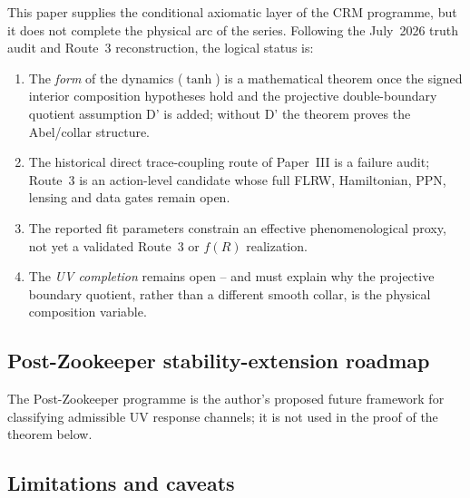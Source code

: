 \documentclass[aps,prd,twocolumn,superscriptaddress,nofootinbib]{revtex4-2}
\begin{document}
This paper supplies the conditional axiomatic layer of the CRM programme, but it does not complete the physical arc of the series. Following the July~2026 truth audit and Route~3 reconstruction, the logical status is:
\begin{enumerate}
\item The \textit{form} of the dynamics ($\tanh$) is a mathematical theorem once the signed interior composition hypotheses hold and the projective double-boundary quotient assumption D' is added; without D' the theorem proves the Abel/collar structure.
\item The historical direct trace-coupling route of Paper~III is a failure audit; Route~3 is an action-level candidate whose full FLRW, Hamiltonian, PPN, lensing and data gates remain open.
\item The reported fit parameters constrain an effective phenomenological proxy, not yet a validated Route~3 or $f(R)$ realization.
\item The \textit{UV completion} remains open -- and must explain why the projective boundary quotient, rather than a different smooth collar, is the physical composition variable.
\end{enumerate}

\subsection{Post-Zookeeper stability-extension roadmap}

The Post-Zookeeper programme is the author's proposed future framework for classifying admissible UV response channels; it is not used in the proof of the theorem below.

\subsection{Limitations and caveats}
\end{document}
